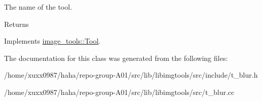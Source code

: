 The name of the tool. 

\begin{DoxyReturn}{Returns}

\end{DoxyReturn}


Implements \hyperlink{classimage__tools_1_1Tool_a251c179e3ac9756d08fbcd082750f8a9}{image\+\_\+tools\+::\+Tool}.



The documentation for this class was generated from the following files\+:\begin{DoxyCompactItemize}
\item 
/home/xuxx0987/haha/repo-\/group-\/\+A01/src/lib/libimgtools/src/include/t\+\_\+blur.\+h\item 
/home/xuxx0987/haha/repo-\/group-\/\+A01/src/lib/libimgtools/src/t\+\_\+blur.\+cc\end{DoxyCompactItemize}
